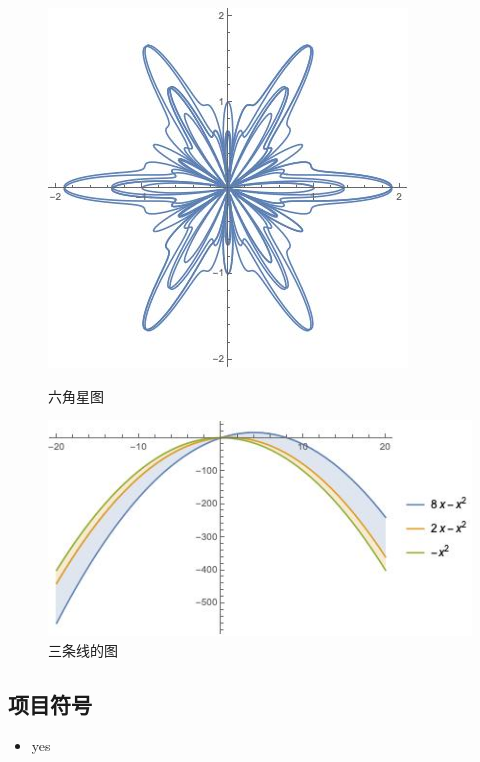 	
\begin{figure}[!htb] %
\begin{minipage}[t]{0.48\linewidth} %
	\centering %
	\includegraphics[scale=0.48]{six.jpg} %
	\caption{六角星图}
\end{minipage}
\hfill
\begin{minipage}[t]{0.48\linewidth}
	\centering %
	\includegraphics[scale=0.48]{ploy.jpg} %
	\caption{三条线的图}	
\end{minipage}
	
\end{figure}


\subsection{项目符号}
\begin{itemize} %
	\item yes
\end{itemize}


